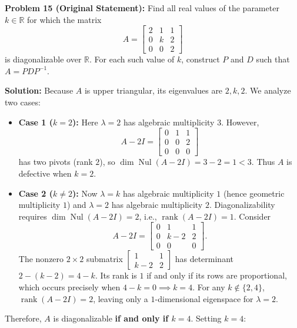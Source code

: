 \documentclass[11pt, letterpaper]{article}
\theoremstyle{definition}
\theoremstyle{remark}
\begin{document}
\vspace{0.8em}
\textbf{Problem 15 (Original Statement):}
Find all real values of the parameter $k \in \mathbb{R}$ for which the matrix
\[
A = \begin{bmatrix} 2 & 1 & 1 \\ 0 & k & 2 \\ 0 & 0 & 2 \end{bmatrix}
\]
is diagonalizable over $\mathbb{R}$. For each such value of $k$, construct $P$ and $D$ such that $A = PDP^{-1}$.

\textbf{Solution:}
Because $A$ is upper triangular, its eigenvalues are $2, k, 2$. We analyze two cases:
\begin{itemize}
    \item \textbf{Case 1 ($k = 2$):} Here $\lambda = 2$ has algebraic multiplicity $3$. However,
    \[
    A - 2I = \begin{bmatrix} 0 & 1 & 1 \\ 0 & 0 & 2 \\ 0 & 0 & 0 \end{bmatrix}
    \]
    has two pivots (rank $2$), so $\dim\operatorname{Nul}(A - 2I) = 3 - 2 = 1 < 3$. Thus $A$ is defective when $k = 2$.
    \item \textbf{Case 2 ($k \neq 2$):} Now $\lambda = k$ has algebraic multiplicity $1$ (hence geometric multiplicity $1$) and $\lambda = 2$ has algebraic multiplicity $2$. Diagonalizability requires $\dim\operatorname{Nul}(A - 2I) = 2$, i.e., $\operatorname{rank}(A - 2I) = 1$. Consider
    \[
    A - 2I = \begin{bmatrix} 0 & 1 & 1 \\ 0 & k - 2 & 2 \\ 0 & 0 & 0 \end{bmatrix}.
    \]
    The nonzero $2 \times 2$ submatrix $\begin{bmatrix} 1 & 1 \\ k-2 & 2 \end{bmatrix}$ has determinant $2 - (k - 2) = 4 - k$. Its rank is $1$ if and only if its rows are proportional, which occurs precisely when $4 - k = 0 \implies k = 4$. For any $k \notin \{2, 4\}$, $\operatorname{rank}(A - 2I) = 2$, leaving only a $1$-dimensional eigenspace for $\lambda = 2$.
\end{itemize}
Therefore, $A$ is diagonalizable \textbf{if and only if $k = 4$}. Setting $k = 4$:
\end{document}
